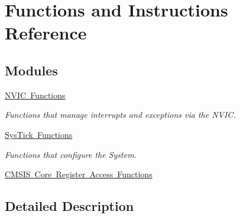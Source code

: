 \hypertarget{group___c_m_s_i_s___core___function_interface}{}\section{Functions and Instructions Reference}
\label{group___c_m_s_i_s___core___function_interface}
\subsection*{Modules}
\begin{DoxyCompactItemize}
\item 
\mbox{\hyperlink{group___c_m_s_i_s___core___n_v_i_c_functions}{N\+V\+I\+C Functions}}
\begin{DoxyCompactList}\small\item\em Functions that manage interrupts and exceptions via the N\+V\+IC. \end{DoxyCompactList}\item 
\mbox{\hyperlink{group___c_m_s_i_s___core___sys_tick_functions}{Sys\+Tick Functions}}
\begin{DoxyCompactList}\small\item\em Functions that configure the System. \end{DoxyCompactList}\item 
\mbox{\hyperlink{group___c_m_s_i_s___core___reg_acc_functions}{C\+M\+S\+I\+S Core Register Access Functions}}
\end{DoxyCompactItemize}


\subsection{Detailed Description}
